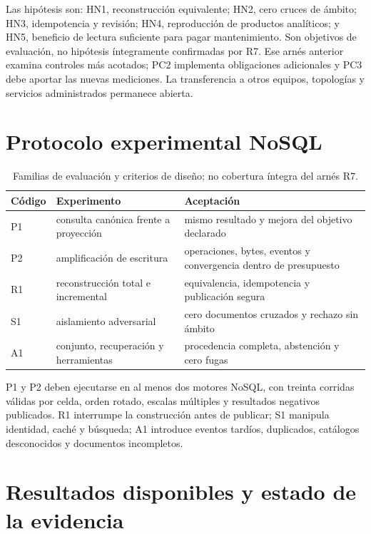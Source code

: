 \documentclass[12pt]{article}
\begin{document}
Las hipótesis son: HN1, reconstrucción equivalente; HN2, cero cruces de ámbito; HN3,
idempotencia y revisión; HN4, reproducción de productos analíticos; y HN5, beneficio de
lectura suficiente para pagar mantenimiento. Son objetivos de evaluación, no hipótesis
íntegramente confirmadas por R7. Ese arnés anterior examina controles más acotados;
PC2 implementa obligaciones adicionales y PC3 debe aportar las nuevas mediciones.
La transferencia a otros equipos, topologías y servicios administrados permanece abierta.

\section{Protocolo experimental NoSQL}

\begin{table}[H]\centering
\caption{Familias de evaluación y criterios de diseño; no cobertura íntegra del arnés R7.}
\begin{tabularx}{\textwidth}{p{1.4cm}p{3.5cm}X}\toprule
Código & Experimento & Aceptación\\\midrule
P1 & consulta canónica frente a proyección & mismo resultado y mejora del objetivo declarado\\
P2 & amplificación de escritura & operaciones, bytes, eventos y convergencia dentro de presupuesto\\
R1 & reconstrucción total e incremental & equivalencia, idempotencia y publicación segura\\
S1 & aislamiento adversarial & cero documentos cruzados y rechazo sin ámbito\\
A1 & conjunto, recuperación y herramientas & procedencia completa, abstención y cero fugas\\
\bottomrule\end{tabularx}\end{table}

P1 y P2 deben ejecutarse en al menos dos motores NoSQL, con treinta corridas válidas por
celda, orden rotado, escalas múltiples y resultados negativos publicados. R1 interrumpe
la construcción antes de publicar; S1 manipula identidad, caché y búsqueda; A1 introduce
eventos tardíos, duplicados, catálogos desconocidos y documentos incompletos.

\section{Resultados disponibles y estado de la evidencia}


\end{document}
